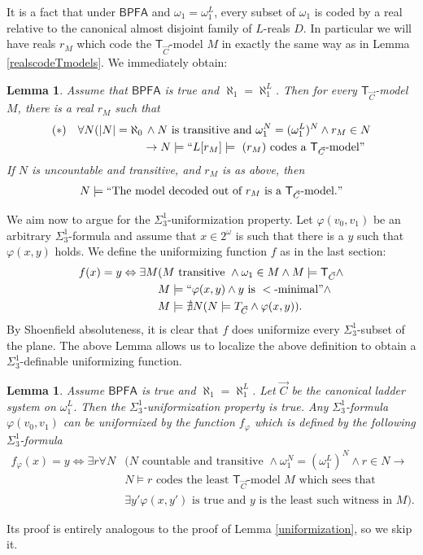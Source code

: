 \documentclass[a4paper,12pt]{article}
\newtheorem{lemma}[theorem]{Lemma}
\newcommand{\BPFA}{\mathsf{BPFA}}
\newcommand{\T}{\mathsf{T}}
\begin{document}
It is a fact that under $\BPFA$ and $\omega_1=\omega_1^L$, every subset of $\omega_1$ is coded by a real relative to the canonical almost disjoint family of $L$-reals $D$. In particular we will have reals $r_M$ which code the $\T_{\vec{C}}$-model $M$ in exactly the same way as in Lemma \ref{realscodeTmodels}. We immediately obtain:
\begin{lemma}
Assume that $\BPFA$ is true and $\aleph_1=\aleph_1^L$. Then for every $\T_{\vec{C}}$-model $M$, there is a real $r_M$ such that
\begin{align*}
(\ast) \quad \forall N (|N| = \aleph_0& \, \land N \text{ is transitive and }  \omega_1^N=(\omega_1^{L})^N  \land r_M \in N \\& \rightarrow
N \models  ``L[r_M] \models \text{ $(r_M)$ codes a $\T_{\vec{C}}$-model}"
\end{align*}
If $N$ is uncountable and transitive,  and $r_M$ is as above, then
\begin{align*}
N \models ``\text{The model decoded out of $r_M$ is a $\T_{\vec{C}}$-model.}"
\end{align*}

\end{lemma}

We aim now to argue for the $\Sigma^1_3$-uniformization property. Let $\varphi(v_0,v_1)$ be an arbitrary $\Sigma^1_3$-formula and assume that $x \in 2^{\omega}$ is such that there is a $y$ such that $\varphi(x,y)$ holds. We define the uniformizing function $f$ as in the last section:
\begin{align*}
f(x)=y \Leftrightarrow \exists M &(M \text{ transitive } \land \omega_1 \in M \land M \models \T_{\vec{C}} \land \\& M \models \text{“}\varphi(x,y) \land y \text{ is } < \text{-minimal}" \land \\& M \models \nexists N ( N \models T_{\vec{C}} \land \varphi(x,y)).
\end{align*}
By Shoenfield absoluteness, it is clear that $f$ does uniformize every $\Sigma^1_3$-subset of the plane. The above Lemma allows us to localize the above definition to obtain a $\Sigma^1_3$-definable uniformizing function.

\begin{lemma}
Assume $\BPFA$ is true and $\aleph_1=\aleph_1^L$. Let $\vec{C}$ be the canonical ladder system on $\omega_1^L$. Then the $\Sigma^1_3$-uniformization property is true. Any $\Sigma^1_3$-formula $\varphi(v_0,v_1)$ can be uniformized by the function $f_{\varphi}$ which is defined by the following $\Sigma^1_3$-formula
\begin{align*}
f_{\varphi}(x)=y \Leftrightarrow \exists r \forall N &(N \text{ countable and transitive } \land \omega_1^N= (\omega_1^L)^N \land r \in N \rightarrow  \\& N \models r\text{ codes the least } \T_{\vec{C}}\text{-model } M \text{ which sees that } \\& \exists y' \varphi(x,y') \text{ is true and } y \text{ is the least such witness in } M).
\end{align*}

\end{lemma}
Its proof is entirely analogous to the proof of Lemma \ref{uniformization}, so we skip it.
\end{document}

